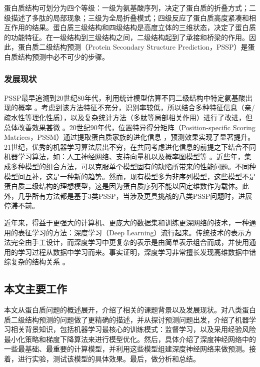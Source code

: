 \documentclass[a4paper, tikz]{article}
\begin{document}
蛋白质结构可划分为四个等级：一级为氨基酸序列，决定了蛋白质的折叠方式；二级描述了多肽的局部现象；三级为全局折叠模式；四级反应了蛋白质高度紧凑和相互作用的结果。蛋白质三级结构和四级结构是高度立体的三维状态，决定了蛋白质的功能特征。在一级结构到三级结构之间，二级结构起到了承接和桥梁的作用。因此，蛋白质二级结构预测（Protein Secondary Structure Prediction，PSSP）是蛋白质结构预测中必不可少的步骤。

\subsubsection{发展现状}
PSSP最早追溯到20世纪80年代，利用统计模型估算不同二级结构中特定氨基酸出现的概率\citep{levitt1976structural} 。考虑到该方法特征不充分，识别率较低，所以结合多种特征信息（亲/疏水性等理化性质），以及复杂统计方法（多肽等局部相关作用）进行了改进，但总体改善效果甚微\citep{zhang2005improving} 。20世纪90年代，位置特异得分矩阵（Position-specific Scoring Matrices，PSSM）通过提取蛋白质家族的进化信息\citep{jones1999protein} ，预测效果实现了显著提升。21世纪，优秀的机器学习算法层出不穷，在共同考虑进化信息的前提之下结合不同机器学习算法，如：人工神经网络、支持向量机以及概率图模型等\citep{wu1995neural}\citep{gewehr2005ssep}\citep{asai1993prediction} 。近些年，集成多种模型的组合方法，可以克服单个模型固有的缺陷所带来的性能问题。不同种模型间互补，这是一种新的趋势\citep{bidargaddi2009combining}。然而，现有模型多为非序列模型，这些模型不是蛋白质二级结构的理想模型，这是因为蛋白质序列不能以固定维数作为载体。此外，几乎所有方法都是基于3类PSSP，当涉及更具挑战的八类PSSP问题时，进展停滞不前。

近年来，得益于更强大的计算机、更庞大的数据集和训练更深网络的技术，一种通用的表征学习的方法：深度学习（Deep Learning）流行起来。传统技术的表示方法完全由手工设计，而深度学习中更复杂的表示是由简单表示组合而成，并使用通用的学习过程从数据中学习而来。事实证明，深度学习非常擅长发现高维数据中错综复杂的结构关系\citep{lecun2015deep} 。

\subsection{本文主要工作}
本文从蛋白质问题的概述展开，介绍了相关的课题背景以及发展现状。对八类蛋白质二级结构预测的问题做了更精确的描述，并从探讨预测问题出发，介绍了机器学习相关背景知识，包括机器学习最核心的训练模式：监督学习，以及采用经验风险最小化策略和梯度下降算法来进行模型优化。然后，具体介绍了深度神经网络中的一些最基础、最重要的计算模型，并利用这些模型组建深度神经网络来做预测。接着，进行实验，测试该模型的具体效果。最后，做分析和总结。
\end{document}
